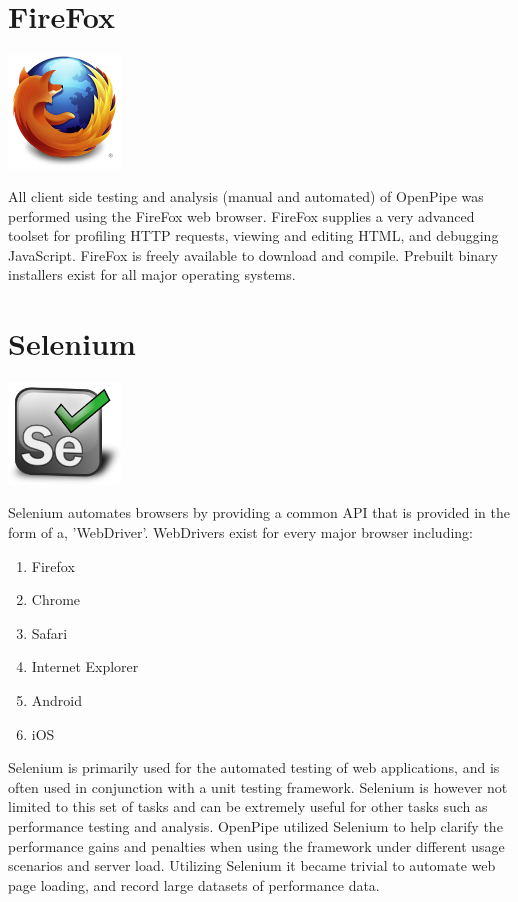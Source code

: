 \documentclass[12pt]{report}
\begin{document}
\section{FireFox}
\begin{center} 
\includegraphics[width=30mm]{figures/images/firefox_logo.png}
\end{center}

All client side testing and analysis (manual and automated) of OpenPipe was performed using the FireFox web browser. FireFox supplies a very advanced toolset for profiling HTTP requests, viewing and editing HTML, and debugging JavaScript. FireFox is freely available to download and compile. Prebuilt binary installers exist for all major operating systems. 
 

\section{Selenium}
\begin{center}
\includegraphics[width=30mm]{figures/images/selenium_logo.png}
\end{center}

Selenium automates browsers by providing a common API that is provided in the form of a, 'WebDriver'. WebDrivers exist for every major browser including:

\begin{enumerate}
\item Firefox
\item Chrome
\item Safari
\item Internet Explorer
\item Android
\item iOS
\end{enumerate}

Selenium is primarily used for the automated testing of web applications, and is often used in conjunction with a unit testing framework.  Selenium is however not limited to this set of tasks and can be extremely useful for other tasks such as performance testing and analysis. OpenPipe utilized Selenium to help clarify the performance gains and penalties when using the framework under different usage scenarios and server load. Utilizing Selenium it became trivial to automate web page loading, and record large datasets of performance data.
\end{document}
